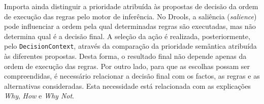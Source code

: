 Importa ainda distinguir a prioridade atribuída às propostas de decisão da
ordem de execução das regras pelo motor de inferência. No Drools, a saliência
(\emph{salience}) pode influenciar a ordem pela qual determinadas regras são
executadas, mas não determina qual é a decisão final. A seleção da ação é
realizada, posteriormente, pelo \texttt{DecisionContext}, através da
comparação da prioridade semântica atribuída às diferentes propostas. Desta
forma, o resultado final não depende apenas da ordem de execução das regras.
Por outro lado, para que as escolhas possam ser compreendidas, é necessário
relacionar a decisão final com os factos, as regras e as alternativas
consideradas. Esta necessidade está relacionada com as explicações
\emph{Why}, \emph{How} e \emph{Why Not}.
